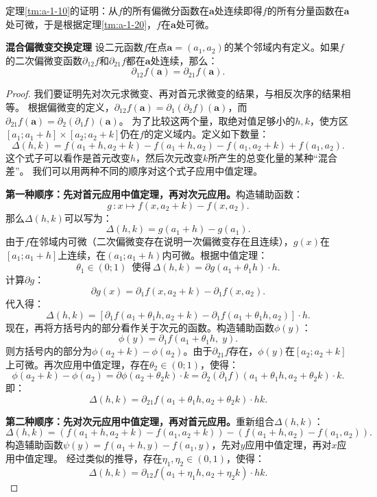 \documentclass[12pt,UTF8]{ctexbook}
\begin{document}
\begin{appendix}
定理\ref{tm:a-1-10}的证明：从$f$的所有偏微分函数在$\mathbf{a}$处连续即得$f$的所有分量函数在$\mathbf{a}$处可微，于是根据定理\ref{tm:a-1-20}，$f$在$\mathbf{a}$处可微。

\begin{tm}{\textbf{混合偏微变交换定理}}
设二元函数$f$在点$\mathbf{a}=(a_1, a_2)$的某个邻域内有定义。如果$f$的二次偏微变函数$\partial_{12} f$和$\partial_{21} f$都在$\mathbf{a}$处连续，那么：
$$ \partial_{12} f(\mathbf{a}) = \partial_{21} f(\mathbf{a}). $$
\end{tm}
\begin{proof}
我们要证明先对次元求微变、再对首元求微变的结果，与相反次序的结果相等。
根据偏微变的定义，$\partial_{12} f(\mathbf{a}) = \partial_1 (\partial_2 f)(\mathbf{a})$，而$\partial_{21} f(\mathbf{a}) = \partial_2 (\partial_1 f)(\mathbf{a})$。
为了比较这两个量，取绝对值足够小的$h, k$，使方区$[a_1;a_1+h]\times[a_2;a_2+k]$仍在$f$的定义域内。定义如下数量：
$$ \Delta(h, k) = f(a_1+h, a_2+k) - f(a_1+h, a_2) - f(a_1, a_2+k) + f(a_1, a_2). $$
这个式子可以看作是首元改变$h$，然后次元改变$k$所产生的总变化量的某种“混合差”。
我们可以用两种不同的顺序对这个式子应用中值定理。

\textbf{第一种顺序：先对首元应用中值定理，再对次元应用。}构造辅助函数：
$$ g \, : x \mapsto f(x, a_2+k) - f(x, a_2). $$
那么$\Delta(h, k)$可以写为：
$$ \Delta(h, k) = g(a_1+h) - g(a_1). $$
由于$f$在邻域内可微（二次偏微变存在说明一次偏微变存在且连续），$g(x)$在$[a_1; a_1+h]$上连续，在$(a_1; a_1+h)$内可微。根据中值定理：
$$ \theta_1 \in (0;1)\,\,\,\mbox{使得}\,\Delta(h, k) = \partial g(a_1 + \theta_1 h) \cdot h. $$
计算$\partial g$：
$$ \partial g(x) = \partial_1 f(x, a_2+k) - \partial_1 f(x, a_2). $$
代入得：
$$ \Delta(h, k) = \left[ \partial_1 f(a_1 + \theta_1 h, a_2+k) - \partial_1 f(a_1 + \theta_1 h, a_2) \right] \cdot h. $$
现在，再将方括号内的部分看作关于次元的函数。构造辅助函数$\phi(y)$：
$$ \phi(y) = \partial_1 f(a_1 + \theta_1 h,\; y). $$
则方括号内的部分为$\phi(a_2+k) - \phi(a_2)$。由于$\partial_{21} f$存在，$\phi(y)$在$[a_2; a_2+k]$上可微。再次应用中值定理，存在$\theta_2 \in (0;1)$，使得：
$$ \phi(a_2+k) - \phi(a_2) =\partial  \phi(a_2 + \theta_2 k) \cdot k = \partial_2 (\partial_1 f)(a_1 + \theta_1 h, a_2 + \theta_2 k) \cdot k. $$
即：
$$ \Delta(h, k) = \partial_{21} f(a_1 + \theta_1 h, a_2 + \theta_2 k) \cdot h k. $$

\textbf{第二种顺序：先对次元应用中值定理，再对首元应用。}重新组合$\Delta(h, k)$：
$$ \Delta(h, k) = \left( f(a_1+h, a_2+k) - f(a_1, a_2+k) \right) - \left( f(a_1+h, a_2) - f(a_1, a_2) \right). $$
构造辅助函数$\psi(y) = f(a_1+h, y) - f(a_1, y)$，先对$y$应用中值定理，再对$x$应用中值定理。
经过类似的推导，存在$\eta_1, \eta_2 \in (0, 1)$，使得：
$$ \Delta(h, k) = \partial_{12} f(a_1 + \eta_1 h, a_2 + \eta_2 k) \cdot h k. $$


\end{proof}
\end{appendix}
\end{document}
